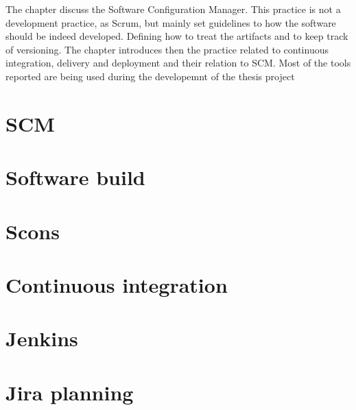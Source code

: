 \documentclass[../main.tex]{subfiles}
\begin{document}
The chapter discuss the Software Configuration Manager. This practice is not a development practice, as Scrum, but mainly set guidelines to how the software should be indeed developed. Defining how to treat the artifacts and to keep track of versioning. The chapter introduces then the practice related to continuous integration, delivery and deployment and their relation to SCM. Most of the tools reported are being used during the developemnt of the thesis project 
\section{SCM }
\section{Software build}
\section{Scons}
\section{Continuous integration}
\section{Jenkins}
\section{Jira planning}
\cleardoublepage
\end{document}
